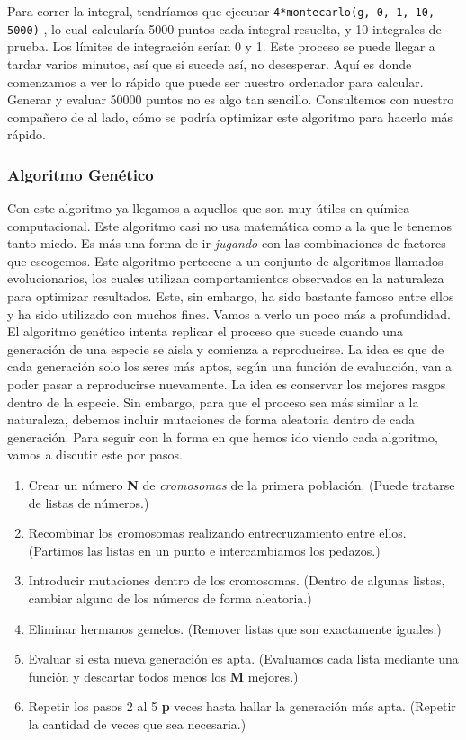 \documentclass[10pt,letterpaper]{article}
\newcommand{\inlinecode}[1]{
\colorbox{light-gray}{\texttt{#1}}
}
\begin{document}
Para correr la integral, tendr\'iamos que ejecutar \inlinecode{4*montecarlo(g, 0, 1, 10, 5000)}, lo cual calcular\'ia 5000 puntos cada integral resuelta, y 10 integrales de prueba. Los l\'imites de integraci\'on ser\'ian 0 y 1. Este proceso se puede llegar a tardar varios minutos, as\'i que si sucede as\'i, no desesperar. Aqu\'i es donde comenzamos a ver lo r\'apido que puede ser nuestro ordenador para calcular. Generar y evaluar 50000 puntos no es algo tan sencillo. Consultemos con nuestro compa\~nero de al lado, c\'omo se podr\'ia optimizar este algoritmo para hacerlo m\'as r\'apido.

\subsubsection{Algoritmo Gen\'etico}
Con este algoritmo ya llegamos a aquellos que son muy \'utiles en qu\'imica computacional. Este algoritmo casi no usa matem\'atica como a la que le tenemos tanto miedo. Es m\'as una forma de ir \textit{jugando} con las combinaciones de factores que escogemos. Este algoritmo pertecene a un conjunto de algoritmos llamados evolucionarios, los cuales utilizan comportamientos observados en la naturaleza para optimizar resultados. Este, sin embargo, ha sido bastante famoso entre ellos y ha sido utilizado con muchos fines. Vamos a verlo un poco m\'as a profundidad.\\

El algoritmo gen\'etico intenta replicar el proceso que sucede cuando una generaci\'on de una especie se aisla y comienza a reproducirse. La idea es que de cada generaci\'on solo los seres m\'as aptos, seg\'un una funci\'on de evaluaci\'on, van a poder pasar a reproducirse nuevamente. La idea es conservar los mejores rasgos dentro de la especie. Sin embargo, para que el proceso sea m\'as similar a la naturaleza, debemos incluir mutaciones de forma aleatoria dentro de cada generaci\'on. Para seguir con la forma en que hemos ido viendo cada algoritmo, vamos a discutir este por pasos.\\

\begin{enumerate}
\item Crear un n\'umero \textbf{N} de \emph{cromosomas} de la primera poblaci\'on. (Puede tratarse de listas de n\'umeros.)
\item Recombinar los cromosomas realizando entrecruzamiento entre ellos. (Partimos las listas en un punto e intercambiamos los pedazos.)
\item Introducir mutaciones dentro de los cromosomas. (Dentro de algunas listas, cambiar alguno de los n\'umeros de forma aleatoria.)
\item Eliminar hermanos gemelos. (Remover listas que son exactamente iguales.)
\item Evaluar si esta nueva generaci\'on es apta. (Evaluamos cada lista mediante una funci\'on y descartar todos menos los \textbf{M} mejores.)
\item Repetir los pasos 2 al 5 \textbf{p} veces hasta hallar la generaci\'on m\'as apta. (Repetir la cantidad de veces que sea necesaria.)
\end{enumerate}
\end{document}
